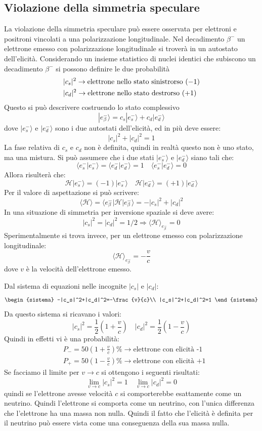 \subsection{Violazione della simmetria speculare}
La violazione della simmetria speculare può essere 
osservata per elettroni e positroni vincolati a una polarizzazione 
longitudinale.
Nel decadimento $\beta^-$ un elettrone emesso con polarizzazione longitudinale 
si troverà in un autostato dell'elicità. Considerando un insieme statistico
di nuclei identici che subiscono un decadimento $\beta^-$ si possono definire 
le due probabilità
\begin{align*}
&|c_s|^2\rightarrow\textup{elettrone nello stato sinistrorso } (-1)\\
&|c_d|^2\rightarrow\textup{elettrone nello stato destrorso } (+1)
\end{align*}
Questo si può descrivere costruendo lo stato complessivo
\[
|e_{\beta}^-\rangle=c_s|e_s^-\rangle+c_d|e_d^-\rangle
\]
dove $|e_s^-\rangle$ e $|e_d^-\rangle$ sono i due autostati dell'elicità, ed 
in più deve essere:
\[
|c_s|^2+|c_d|^2=1
\]
La fase relativa di $c_s$ e $c_d$ non è definita, quindi in realtà questo non 
è uno stato, ma una mistura. Si può assumere che i due stati $|e_s^-\rangle$ 
e $|e_d^-\rangle$
siano tali che:
\[
\langle e_s^-|e_s^-\rangle=\langle e_d^-|e_d^-\rangle=1\quad \langle 
e_s^-|e_d^-\rangle=0
\]
Allora risulterà che:
\[
\mathcal{H}|e_s^-\rangle=(-1)|e_s^-\rangle\quad\mathcal{H}|e_d^-\rangle=(+1)|e_d
^-\rangle
\]
Per il valore di aspettazione si può scrivere:
\[
\langle\mathcal{H}\rangle=\langle 
e_{\beta}^-|\mathcal{H}|e_{\beta}^-\rangle=-|c_s|^2+|c_d|^2
\]
In una situazione di simmetria per inversione spaziale si deve avere:
\[
|c_s|^2=|c_d|^2=1/2\Rightarrow\langle\mathcal{H}\rangle_{e_{\beta}^-}=0
\]
Sperimentalmente si trova invece, per un elettrone emesso con polarizzazione 
longitudinale:
\[
\langle\mathcal{H}\rangle_{e_{\beta}^-}=-\frac{v}{c}
\]
dove $v$ è la velocità dell'elettrone emesso.

Dal sistema di equazioni nelle incognite $|c_s|$ e $|c_d|$:
\[
\begin{sistema}
-|c_s|^2+|c_d|^2=-\frac{v}{c}\\
|c_s|^2+|c_d|^2=1
\end{sistema}
\]
Da questo sistema si ricavano i valori:
\[
|c_s|^2=\frac{1}{2}(1+\frac{v}{c})\quad|c_d|^2=\frac{1}{2}(1-\frac{v}{c})
\]
Quindi in effetti vi è una probabilità:
\begin{align*}
&P_-=50(1+\frac{v}{c})\%\rightarrow\text{elettrone con elicità -1}\\
&P_+=50(1-\frac{v}{c})\%\rightarrow\text{elettrone con elicità +1}
\end{align*}
Se facciamo il limite per $v\rightarrow c$ si ottengono i seguenti risultati:
\[
\lim_{v\rightarrow c}|c_s|^2=1\quad\lim_{v\rightarrow c}|c_d|^2=0
\]
quindi se l'elettrone avesse velocità $c$ si comporterebbe esattamente come un 
neutrino. Quindi l'elettrone si comporta come un neutrino, con l'unica 
differenza
che l'elettrone ha una massa non nulla. Quindi il fatto che l'elicità è 
definita per il neutrino può essere vista come una conseguenza della sua massa 
nulla.

